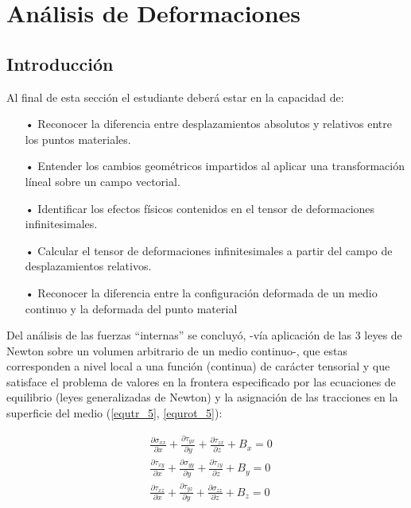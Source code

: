 \documentclass[../notas medios.tex]{subfiles}
\begin{document}
\chapter{Análisis de Deformaciones}

\graphicspath{{IMAGES/Cap5/}} 								 %
\section{Introducción}

Al final de esta sección el estudiante deberá estar en la capacidad de:

\begin{itemize}
\item[•] Reconocer la diferencia entre desplazamientos absolutos y relativos entre los puntos materiales.
\item[•] Entender los cambios geométricos impartidos al aplicar una transformación líneal sobre un campo vectorial.
\item[•] Identificar los efectos físicos contenidos en el tensor de deformaciones infinitesimales.
\item[•] Calcular el tensor de deformaciones infinitesimales a partir del campo de desplazamientos relativos. 
\item[•] Reconocer la diferencia entre la configuración deformada de un medio continuo y la deformada del punto material
\end{itemize}

Del análisis de las fuerzas “internas” se concluyó, -vía aplicación de las 3 leyes de Newton sobre un volumen arbitrario de un medio continuo-, que estas corresponden a nivel local a una función (continua) de carácter tensorial y que satisface el problema de valores en la frontera especificado por las ecuaciones de equilibrio (leyes generalizadas de Newton) y la asignación de las tracciones en la superficie del medio (\cref{equtr_5}, \cref{equrot_5}):

\begin{equation} \label{equtr_5}
\begin{split}
& \frac{{\partial {\sigma _{xx}}}}{{\partial x}} + \frac{{\partial {\tau _{yx}}}}{{\partial y}} + \frac{{\partial {\tau _{zx}}}}{{\partial z}} + {B_x} = 0 \\
& \frac{{\partial {\tau _{xy}}}}{{\partial x}} + \frac{{\partial {\sigma _{yy}}}}{{\partial y}} + \frac{{\partial {\tau _{zy}}}}{{\partial z}} + {B_y} = 0 \\
& \frac{{\partial {\tau _{xz}}}}{{\partial x}} + \frac{{\partial {\tau _{yz}}}}{{\partial y}} + \frac{{\partial {\sigma _{zz}}}}{{\partial z}} + {B_z} = 0 
\end{split}
\end{equation}
\end{document}
